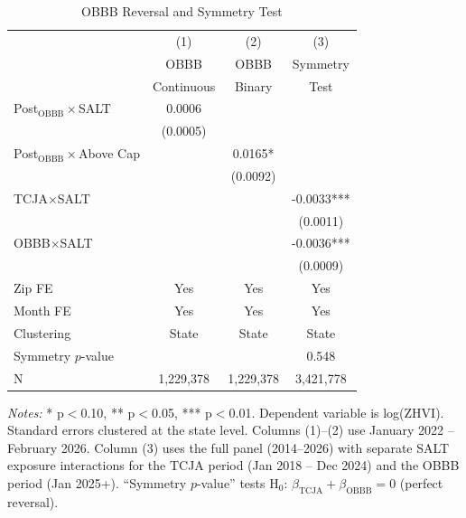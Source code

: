 \begin{table}[H]
\centering
\caption{OBBB Reversal and Symmetry Test}
\begin{threeparttable}
\begin{tabular}{lccc}
\toprule
 & (1) & (2) & (3) \\
 & OBBB & OBBB & Symmetry \\
 & Continuous & Binary & Test \\
\midrule
Post$_{\text{OBBB}}\times$SALT & 0.0006 & & \\
 & (0.0005) & & \\
Post$_{\text{OBBB}}\times$Above Cap & & 0.0165* & \\
 & & (0.0092) & \\
TCJA$\times$SALT & & & -0.0033*** \\
 & & & (0.0011) \\
OBBB$\times$SALT & & & -0.0036*** \\
 & & & (0.0009) \\
\midrule
Zip FE & Yes & Yes & Yes \\
Month FE & Yes & Yes & Yes \\
Clustering & State & State & State \\
Symmetry $p$-value & & & 0.548 \\
N & 1,229,378 & 1,229,378 & 3,421,778 \\
\bottomrule
\end{tabular}
\begin{tablenotes}[flushleft]
\small
\item \textit{Notes:} * p$<$0.10, ** p$<$0.05, *** p$<$0.01. Dependent variable is log(ZHVI). Standard errors clustered at the state level. Columns (1)--(2) use January 2022 -- February 2026. Column (3) uses the full panel (2014--2026) with separate SALT exposure interactions for the TCJA period (Jan 2018 -- Dec 2024) and the OBBB period (Jan 2025+). ``Symmetry $p$-value'' tests H$_0$: $\beta_{\text{TCJA}} + \beta_{\text{OBBB}} = 0$ (perfect reversal).
\end{tablenotes}
\end{threeparttable}
\label{tab:symmetry}
\end{table}

